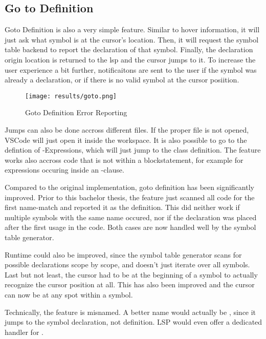 \subsection{Go to Definition}
Goto Definition is also a very simple feature.
Similar to hover information, it will just ask what symbol is at the cursor's location.
Then, it will request the symbol table backend to report the declaration of that symbol.
Finally, the declaration origin location is returned to the lsp and the cursor jumps to it.
To increase the user experience a bit further, notificaitons are sent to the user if the symbol was already a declaration, or if there is no valid symbol at the cursor posiition.
\begin{figure}[h]
    \centering
    \texttt{[image: results/goto.png]}
    \caption{Goto Definition Error Reporting}
    \label{fig:goto}
\end{figure}


Jumps can also be done accross different files.
If the proper file is not opened, VSCode will just open it inside the workspace.
It is also possible to go to the defintion of -Expressions, which will just jump to the class definition.
The feature works also accross code that is not within a blockstatement, for example for expressions occuring inside an -clause.

Compared to the original implementation, goto definition has been significantly improved.
Prior to this bachelor thesis, the feature just scanned all code for the first name-match and reported it as the definition.
This did neither work if multiple symbols with the same name occured, nor if the declaration was placed after the first usage in the code.
Both cases are now handled well by the symbol table generator.

Runtime could also be improved, since the symbol table generator scans for possible declarations scope by scope, and doesn't just iterate over all symbols.
Last but not least, the cursor had to be at the beginning of a symbol to actually recognize the cursor position at all.
This has also been improved and the cursor can now be at any spot within a symbol.

Technically, the feature is misnamed.
A better name would actually be , since it jumps to the symbol declaration, not definition.
LSP would even offer a dedicated handler for  \cite{lspspec}.

